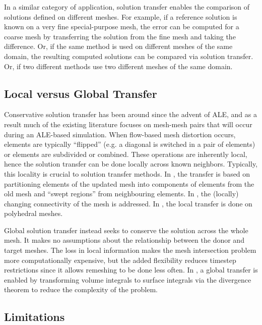 In a similar category of application, solution transfer enables the comparison
of solutions defined on different meshes. For example, if a reference
solution is known on a very fine special-purpose mesh, the error can be
computed for a coarse mesh by transferring the solution from the fine
mesh and taking the difference. Or, if the same method is used on
different meshes of the same domain, the resulting computed solutions can
be compared via solution transfer. Or, if two different methods use two
different meshes of the same domain.

\subsection{Local versus Global Transfer}

Conservative solution transfer has been around since the advent of ALE,
and as a result much of the existing literature focuses on mesh-mesh
pairs that will occur during an ALE-based simulation. When flow-based
mesh distortion occurs, elements are typically ``flipped'' (e.g. a
diagonal is switched in a pair of elements) or elements are subdivided
or combined. These operations are inherently local, hence the solution
transfer can be done locally across known neighbors. Typically, this
locality is crucial to solution transfer methods. In \cite{Margolin2003},
the transfer is based on partitioning elements of the updated mesh into
components of elements from the old mesh and ``swept regions'' from
neighbouring elements. In \cite{Kucharik2008}, the (locally) changing
connectivity of the mesh is addressed. In \cite{Garimella2007}, the
local transfer is done on polyhedral meshes.

Global solution transfer instead seeks to conserve the solution across
the whole mesh. It makes no assumptions about the relationship between
the donor and target meshes. The loss in local information makes
the mesh intersection problem more computationally expensive, but the
added flexibility reduces timestep restrictions since it allows remeshing
to be done less often. In \cite{Dukowicz1984, Dukowicz1987}, a global
transfer is enabled by transforming volume integrals to surface integrals
via the divergence theorem to reduce the complexity of the problem.

\subsection{Limitations}

